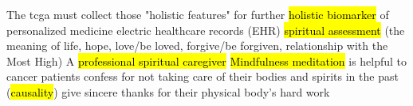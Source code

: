 \documentclass[
paper=landscape,
paper=160mm:90mm, %
fontsize=11pt, %
pagesize, %
parskip=half-, %
]{scrartcl} %
\theoremstyle{mythmstyle} %
\begin{document}
%
\clearpage

\thispagestyle{headings}

\begin{outline}


\1 The \acrshort{tcga} must collect those "holistic features" for further \hl{holistic biomarker} of personalized medicine
    \2 electric healthcare records (EHR)
    \2 \hl{spiritual assessment} (the meaning of life, hope, love/be loved, forgive/be forgiven, relationship with the Most High)
\1 A \hl{professional spiritual caregiver} 
    \2 \hl{Mindfulness meditation} is helpful to cancer patients
    \2 confess for not taking care of their bodies and spirits in the past (\hl{causality})
    \2 give sincere thanks for their physical body's hard work
\end{outline}

\clearpage
\thispagestyle{headings}
\end{document}
